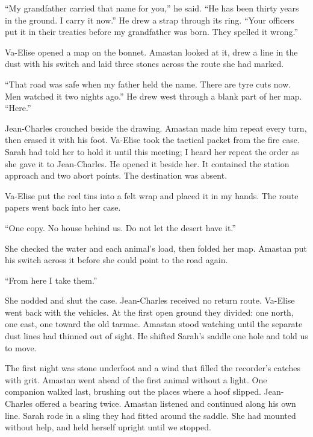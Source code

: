 ``My grandfather carried that name for you,'' he said. ``He has been thirty years in the ground. I carry it now.'' He drew a strap through its ring. ``Your officers put it in their treaties before my grandfather was born. They spelled it wrong.''\par

Va-Elise opened a map on the bonnet. Amastan looked at it, drew a line in the dust with his switch and laid three stones across the route she had marked.\par

``That road was safe when my father held the name. There are tyre cuts now. Men watched it two nights ago.'' He drew west through a blank part of her map. ``Here.''\par

Jean-Charles crouched beside the drawing. Amastan made him repeat every turn, then erased it with his foot. Va-Elise took the tactical packet from the fire case. Sarah had told her to hold it until this meeting; I heard her repeat the order as she gave it to Jean-Charles. He opened it beside her. It contained the station approach and two abort points. The destination was absent.\par

Va-Elise put the reel tins into a felt wrap and placed it in my hands. The route papers went back into her case.\par

``One copy. No house behind us. Do not let the desert have it.''\par

She checked the water and each animal's load, then folded her map. Amastan put his switch across it before she could point to the road again.\par

``From here I take them.''\par

She nodded and shut the case. Jean-Charles received no return route. Va-Elise went back with the vehicles. At the first open ground they divided: one north, one east, one toward the old tarmac. Amastan stood watching until the separate dust lines had thinned out of sight. He shifted Sarah's saddle one hole and told us to move.\par

The first night was stone underfoot and a wind that filled the recorder's catches with grit. Amastan went ahead of the first animal without a light. One companion walked last, brushing out the places where a hoof slipped. Jean-Charles offered a bearing twice. Amastan listened and continued along his own line. Sarah rode in a sling they had fitted around the saddle. She had mounted without help, and held herself upright until we stopped.\par

